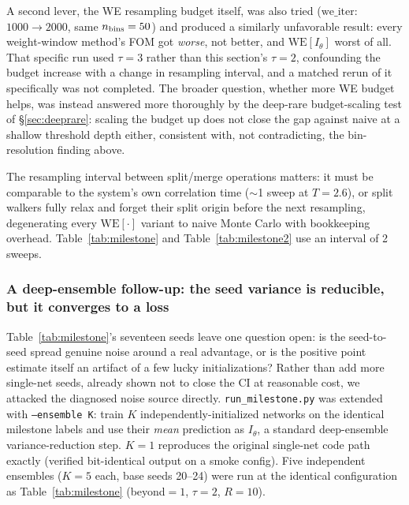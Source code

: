 \documentclass[a4paper,fleqn]{cas-sc}
\begin{document}
A second lever, the WE resampling budget itself, was also tried
($\mathrm{we\_iter}$: $1000\to2000$, same $n_{\rm bins}=50$) and produced a similarly
unfavorable result: every weight-window method's FOM got \emph{worse}, not better, and
$\mathrm{WE}[I_\theta]$ worst of all. That specific run used $\tau=3$ rather than this
section's $\tau=2$, confounding the budget increase with a change in resampling interval,
and a matched rerun of it specifically was not completed. The broader question, whether
more WE budget helps, was instead answered more thoroughly by the deep-rare
budget-scaling test of \S\ref{sec:deeprare}: scaling the budget up does not close the gap
against naive at a shallow threshold depth either, consistent with, not contradicting,
the bin-resolution finding above.

The resampling interval between split/merge operations matters: it must be comparable to
the system's own correlation time ($\sim$1 sweep at $T=2.6$), or split walkers fully relax
and forget their split origin before the next resampling, degenerating every
$\mathrm{WE}[\cdot]$ variant to naive Monte Carlo with bookkeeping overhead. Table~\ref{tab:milestone}
and Table~\ref{tab:milestone2} use an interval of 2 sweeps.

\subsubsection{A deep-ensemble follow-up: the seed variance is reducible, but it converges
	to a loss}
\label{sec:ensemble}
Table~\ref{tab:milestone}'s seventeen seeds leave one question open: is the
seed-to-seed spread genuine noise around a real advantage, or is the positive point
estimate itself an artifact of a few lucky initializations? Rather than add more single-net
seeds, already shown not to close the CI at reasonable cost, we attacked the diagnosed
noise source directly. \texttt{run\_milestone.py} was extended with \texttt{--ensemble
	K}: train $K$ independently-initialized networks on the identical milestone labels and
use their \emph{mean} prediction as $I_\theta$, a standard deep-ensemble variance-reduction
step. $K=1$ reproduces the original single-net code path exactly (verified bit-identical
output on a smoke config). Five independent ensembles ($K=5$ each, base seeds 20--24) were
run at the identical configuration as Table~\ref{tab:milestone} (beyond$=1$, $\tau=2$, $R=10$).
\end{document}
